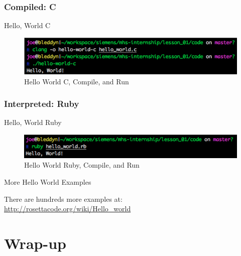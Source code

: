 \documentclass[serif,mathserif,compress]{beamer}
\begin{document}
\subsubsection{Compiled: C}
\begin{frame}[fragile]{Hello, World C}
  
  \pause

  \begin{figure}
  \centering
  \includegraphics[width=\textwidth]{images/hello-world-c.png}
  \caption{Hello World C, Compile, and Run}
  \label{fig:hello-world-c-output}
  \end{figure}
\end{frame}


\subsubsection{Interpreted: Ruby}
\begin{frame}[fragile]{Hello, World Ruby}
  
  \pause

  \begin{figure}
  \centering
  \includegraphics[width=\textwidth]{images/hello-world-ruby.png}
  \caption{Hello World Ruby, Compile, and Run}
  \label{fig:hello-world-ruby-output}
  \end{figure}
\end{frame}

\begin{frame}{More Hello World Examples}
  \begin{center}
    There are hundreds more examples at: \\
    \url{http://rosettacode.org/wiki/Hello_world}
  \end{center}
\end{frame}

\section{Wrap-up}
\end{document}
